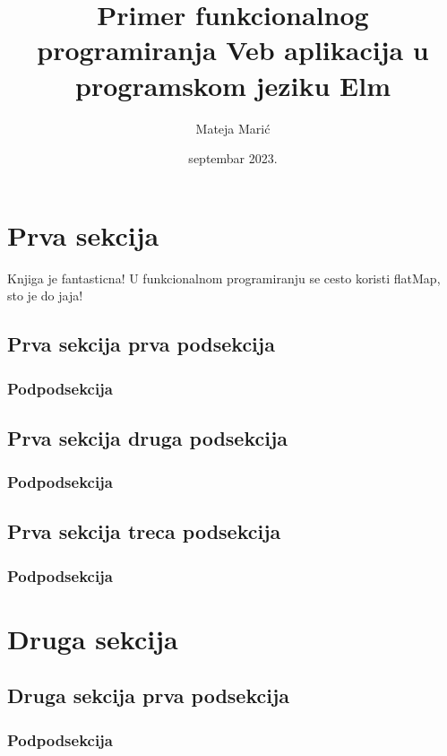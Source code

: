 \documentclass{viser-thesis}
\author{Mateja Marić}
\title{Primer funkcionalnog programiranja Veb aplikacija u programskom jeziku Elm}
\date{septembar 2023.}
\begin{document}
\maketitle
{}
\infopage
{
\pagestyle{plain}
\tableofcontents
\newpage
\pagestyle{fancy}%
}


\section{Prva sekcija}
Knjiga \textcite{feldman2020elm} je fantasticna!
U funkcionalnom programiranju se cesto koristi flatMap, sto je do jaja! \parencite{feldman2020elm}
\newpage
\subsection{Prva sekcija prva podsekcija}
\newpage
\subsubsection{Podpodsekcija}
\newpage
\subsection{Prva sekcija druga podsekcija}
\newpage
\subsubsection{Podpodsekcija}
\newpage
\subsection{Prva sekcija treca podsekcija}
\newpage
\subsubsection{Podpodsekcija}
\newpage

\section{Druga sekcija}
\newpage
\subsection{Druga sekcija prva podsekcija}
\newpage
\subsubsection{Podpodsekcija}
\newpage
\end{document}
